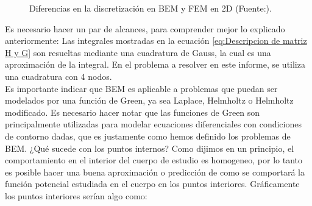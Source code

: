 \documentclass[11pt]{article}
\begin{document}
\begin{figure}[H]
\label{fig:Discretizacion BEM y FEM 2}
\centering
{}
\caption{Diferencias en la discretización en BEM y FEM en 2D  (Fuente:\cite{Brebbia}).}
\end{figure}
Es necesario hacer un par de alcances, para comprender mejor lo explicado anteriormente:
Las integrales mostradas en la ecuación \eqref{eq:Descripcion de matriz H y G} son resueltas mediante una cuadratura de Gauss, la cual es una aproximación de la integral. En el problema a resolver en este informe, se utiliza una cuadratura con 4 nodos.\\
Es importante indicar que BEM es aplicable a problemas que puedan ser modelados por una función de Green, ya sea Laplace, Helmholtz o Helmholtz modificado. Es necesario hacer notar que las funciones de Green son principalmente utilizadas para modelar ecuaciones diferenciales con condiciones de contorno dadas, que es justamente como hemos definido los problemas de BEM.
\newpage
¿Qué sucede con los puntos internos? Como dijimos en un principio, el comportamiento en el interior del cuerpo de estudio es homogeneo, por lo tanto es posible hacer una buena aproximación o predicción de como se comportará la función potencial estudiada en el cuerpo en los puntos interiores. Gráficamente los puntos interiores serían algo como:
\end{document}

